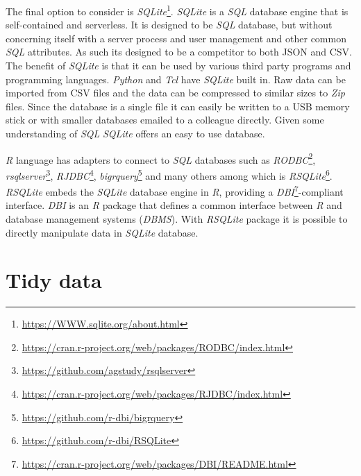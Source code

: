 \documentclass[12pt,oneside]{reedthesis}
\theoremstyle{definition}
\theoremstyle{definition}
\theoremstyle{definition}
\theoremstyle{remark}
\begin{document}
The final option to consider is \emph{SQLite}\footnote{\url{https://WWW.sqlite.org/about.html}}.
\emph{SQLite} is a \emph{SQL} database engine that is self-contained and
serverless. It is designed to be \emph{SQL} database, but without
concerning itself with a server process and user management and other
common \emph{SQL} attributes. As such its designed to be a competitor to
both JSON and CSV. The benefit of \emph{SQLite} is that it can be used
by various third party programs and programming languages. \emph{Python}
and \emph{Tcl} have \emph{SQLite} built in. Raw data can be imported
from CSV files and the data can be compressed to similar sizes to
\emph{Zip} files. Since the database is a single file it can easily be
written to a USB memory stick or with smaller databases emailed to a
colleague directly. Given some understanding of \emph{SQL} \emph{SQLite}
offers an easy to use database.

\emph{R} language has adapters to connect to \emph{SQL} databases such
as \emph{RODBC}\footnote{\url{https://cran.r-project.org/web/packages/RODBC/index.html}},
\emph{rsqlserver}\footnote{\url{https://github.com/agstudy/rsqlserver}},
\emph{RJDBC}\footnote{\url{https://cran.r-project.org/web/packages/RJDBC/index.html}},
\emph{bigrquery}\footnote{\url{https://github.com/r-dbi/bigrquery}} and
many others among which is \emph{RSQLite}\footnote{\url{https://github.com/r-dbi/RSQLite}}.
\emph{RSQLite} embeds the \emph{SQLite} database engine in \emph{R},
providing a \emph{DBI}\footnote{\url{https://cran.r-project.org/web/packages/DBI/README.html}}-compliant
interface. \emph{DBI} is an \emph{R} package that defines a common
interface between \emph{R} and database management systems
(\emph{DBMS}). With \emph{RSQLite} package it is possible to directly
manipulate data in \emph{SQLite} database.

\section{Tidy data}\label{tidy-data}
\end{document}
